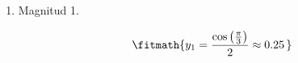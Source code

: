 \begin{enumerate}

\item Magnitud 1.

\[\fitmath{y_{1}=\frac{\cos\left(\frac{\pi}{3}\right)}{2}\approx 0.25\,}\]

\end{enumerate}
